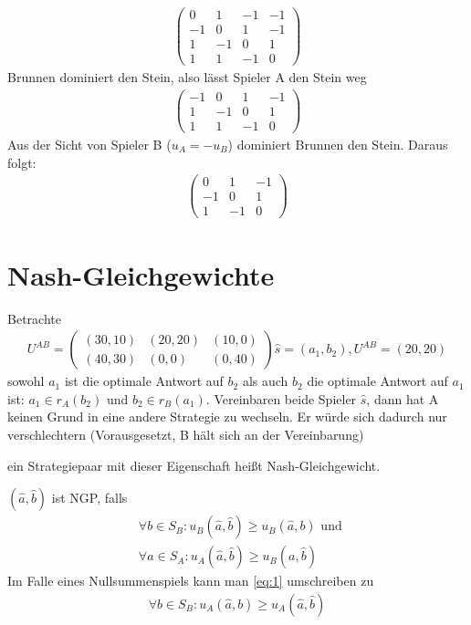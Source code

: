\begin{bsp}
	\begin{align*}
		\begin{pmatrix}
			0 & 1 & -1 & -1 \\
			-1 & 0 & 1 & -1 \\
			1 & -1 & 0 & 1 \\
			1 & 1 & -1 & 0
		\end{pmatrix}
	\end{align*}
	Brunnen dominiert den Stein, also lässt Spieler A den Stein weg
	\begin{align*}
		\begin{pmatrix}
			-1 & 0 & 1 & -1 \\
			1 & -1 & 0 & 1 \\
			1 & 1 & -1 & 0
		\end{pmatrix}
	\end{align*}	
	Aus der Sicht von Spieler B ($u_A=-u_B$) dominiert Brunnen den Stein. Daraus folgt: 
	\begin{align*}
		\begin{pmatrix}
			 0 & 1 & -1 \\
			-1 & 0 & 1 \\
			1 & -1 & 0
		\end{pmatrix}
	\end{align*}	
\end{bsp}

\section{Nash-Gleichgewichte}

Betrachte 
\begin{align*}
	U^{AB}= \begin{pmatrix}
		(30,10) & (20,20) & (10,0) \\
		(40,30) & (0,0) & (0,40)
	\end{pmatrix}
	\hat{s}=(a_1,b_2), U^{AB}= (20,20)
\end{align*}
sowohl $a_1$ ist die optimale Antwort auf $b_2$ als auch $b_2$ die optimale Antwort auf $a_1$ ist: $a_1 \in r_A(b_2) $ und $b_2 \in r_B(a_1)$. Vereinbaren beide Spieler $\hat{s}$, dann hat A keinen Grund in eine andere Strategie zu wechseln. Er würde sich dadurch nur verschlechtern (Vorausgesetzt, B hält sich an der Vereinbarung) 

ein Strategiepaar mit dieser Eigenschaft heißt Nash-Gleichgewicht. 

\begin{defi}
	$(\hat{a}, \hat{b})$ ist NGP, falls 
	\begin{align}
		\label{eq:1}
		& \forall b \in S_B : u_B(\hat{a}, \hat{b} ) \geq u_B(\hat{a}, b) \text{ und } \\
		& \forall a \in S_A : u_A(\hat{a}, \hat{b} ) \geq u_B(a, \hat{b}) 
	\end{align}
	Im Falle eines Nullsummenspiels kann man \ref{eq:1} umschreiben zu 
	\begin{align}
		\label{eq:2}
		\forall b \in S_B : u_A(\hat{a}, b) \geq u_A(\hat{a}, \hat{b})
	\end{align} 
\end{defi}

